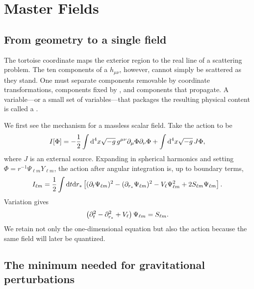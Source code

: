 \chapter{Master Fields}
\label{chap:master-field}

\section{From geometry to a single field}

The tortoise coordinate maps the exterior region to the real line of a scattering problem. The ten components of a  $h_{\mu\nu}$, however, cannot simply be scattered as they stand. One must separate components removable by coordinate transformations, components fixed by , and components that propagate. A variable---or a small set of variables---that packages the resulting physical content is called a .

We first see the mechanism for a massless scalar field. Take the action to be
\begin{equation}
I[\Phi]
=
-\frac{1}{2}
\int \mathrm{d}^4x\sqrt{-g}\,
g^{\mu\nu}\partial_\mu\Phi\partial_\nu\Phi
+\int \mathrm{d}^4x\sqrt{-g}\,J\Phi,
\label{eq:scalar-action}
\end{equation}
where $J$ is an external source. Expanding in spherical harmonics and setting $\Phi=r^{-1}\Psi_{\ell m}Y_{\ell m}$, the action after angular integration is, up to boundary terms,
\begin{equation}
I_{\ell m}
=
\frac{1}{2}
\int \mathrm{d} t\mathrm{d} r_*
\left[
(\partial_t\Psi_{\ell m})^2
-(\partial_{r_*}\Psi_{\ell m})^2
-V_\ell\Psi_{\ell m}^2
+2S_{\ell m}\Psi_{\ell m}
\right].
\label{eq:reduced-master-action}
\end{equation}
Variation gives
\begin{equation}
\left(
\partial_t^2-\partial_{r_*}^2+V_\ell
\right)\Psi_{\ell m}
=
S_{\ell m}.
\label{eq:master-action-eom}
\end{equation}
We retain not only the one-dimensional equation but also the action because the same field will later be quantized.

\section{The minimum needed for gravitational perturbations}

